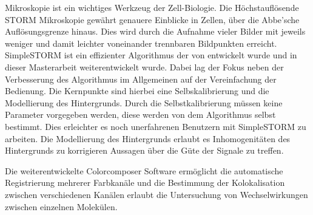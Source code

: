 Mikroskopie ist ein wichtiges Werkzeug der Zell-Biologie. Die H\"ochstaufl\"osende STORM Mikroskopie gew\"ahrt genauere Einblicke in Zellen, \"uber die Abbe'sche Aufl\"osungsgrenze hinaus. Dies wird durch die Aufnahme vieler Bilder mit jeweils weniger und damit leichter voneinander trennbaren Bildpunkten erreicht.\newline
SimpleSTORM ist ein effizienter Algorithmus der von \cite{MAJoachim} entwickelt wurde und in dieser Masterarbeit weiterentwickelt wurde. Dabei lag der Fokus neben der Verbesserung des Algorithmus im Allgemeinen auf der Vereinfachung der Bedienung. Die Kernpunkte sind hierbei eine Selbskalibrierung und die Modellierung des Hintergrunds.\newline
Durch die Selbstkalibrierung m\"ussen keine Parameter vorgegeben werden, diese werden von dem Algorithmus selbst bestimmt. Dies erleichter es noch unerfahrenen Benutzern mit SimpleSTORM zu arbeiten.
Die Modellierung des Hintergrunds erlaubt es Inhomogenit\"aten des Hintergrunds zu korrigieren Aussagen \"uber die G\"ute der Signale zu treffen.

Die weiterentwickelte Colorcomposer Software erm\"oglicht die automatische Registrierung mehrerer Farbkan\"ale und die Bestimmung der Kolokalisation zwischen verschiedenen Kan\"alen erlaubt die Untersuchung von Wechselwirkungen zwischen einzelnen Molek\"ulen.